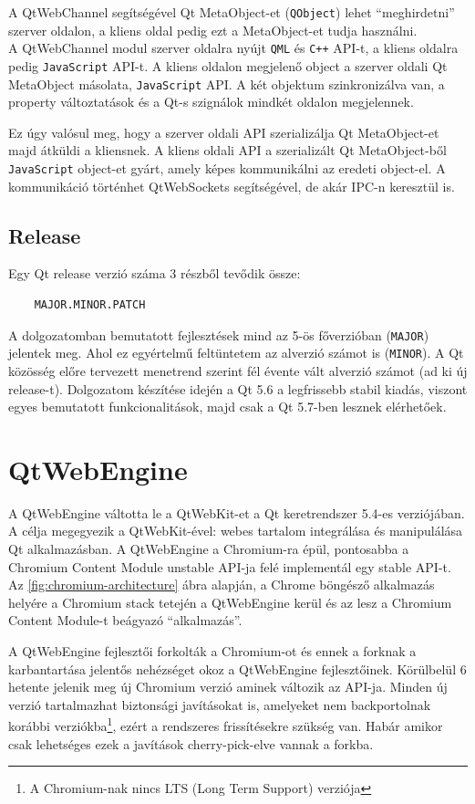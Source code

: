 \documentclass[12pt]{report}
\begin{document}
A QtWebChannel segítségével Qt MetaObject-et (\texttt{QObject}) lehet ``meghirdetni'' \\
szerver oldalon, a kliens oldal pedig ezt a MetaObject-et tudja használni. \\
A QtWebChannel modul szerver oldalra nyújt \texttt{QML} és \texttt{C++} API-t,
a kliens oldalra pedig \texttt{JavaScript} API-t. A kliens oldalon megjelenő object a
szerver oldali Qt MetaObject másolata, \texttt{JavaScript} API. A két objektum szinkronizálva
van, a property változtatások és a Qt-s szignálok mindkét oldalon megjelennek.

Ez úgy valósul meg, hogy a szerver oldali API szerializálja Qt MetaObject-et majd átküldi
a kliensnek. A kliens oldali API a szerializált Qt MetaObject-ből \texttt{JavaScript}
object-et gyárt, amely képes kommunikálni az eredeti object-el. A kommunikáció történhet
QtWebSockets segítségével, de akár IPC-n keresztül is.
\cite{bib:qt-doc-qt-webchannel, bib:kdab-qt-webchannel}


\subsection{Release}
Egy Qt release verzió száma 3 részből tevődik össze:
\begin{verbatim}
    MAJOR.MINOR.PATCH
\end{verbatim}
A dolgozatomban bemutatott fejlesztések mind az 5-ös főverzióban (\texttt{MAJOR})
jelentek meg. Ahol ez egyértelmű feltüntetem az alverzió számot is (\texttt{MINOR}).
A Qt közösség előre tervezett menetrend szerint fél évente vált alverzió számot (ad ki új
release-t). Dolgozatom készítése idején a Qt 5.6 a legfrissebb stabil kiadás, viszont egyes
bemutatott funkcionalitások, majd csak a Qt 5.7-ben lesznek elérhetőek.

\section{QtWebEngine}
A QtWebEngine váltotta le a QtWebKit-et a Qt keretrendszer 5.4-es verziójában. A célja
megegyezik a QtWebKit-ével: webes tartalom integrálása és manipulálása Qt alkalmazásban.
A QtWebEngine a Chromium-ra épül, pontosabba a Chromium Content Module unstable API-ja
felé implementál egy stable API-t. Az \ref{fig:chromium-architecture} ábra alapján,
a Chrome böngésző alkalmazás helyére a Chromium stack tetején a QtWebEngine kerül és
az lesz a Chromium Content Module-t beágyazó ``alkalmazás''.

A QtWebEngine fejlesztői forkolták a Chromium-ot és ennek a forknak a karbantartása jelentős
nehézséget okoz a QtWebEngine fejlesztőinek. Körülbelül 6 hetente jelenik meg új Chromium
verzió aminek változik az API-ja. Minden új verzió tartalmazhat biztonsági javításokat is,
amelyeket nem backportolnak korábbi verziókba\footnote{A Chromium-nak nincs LTS (Long Term
Support) verziója}, ezért a rendszeres frissítésekre szükség van. Habár amikor csak
lehetséges ezek a javítások cherry-pick-elve vannak a forkba.
\end{document}

